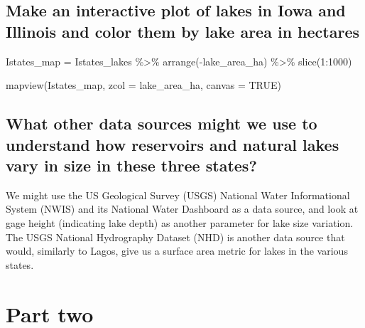 \documentclass[
]{book}
\newenvironment{Shaded}{\begin{snugshade}}{\end{snugshade}}
\newcommand{\AttributeTok}[1]{\textcolor[rgb]{0.77,0.63,0.00}{#1}}
\newcommand{\ConstantTok}[1]{\textcolor[rgb]{0.00,0.00,0.00}{#1}}
\newcommand{\DecValTok}[1]{\textcolor[rgb]{0.00,0.00,0.81}{#1}}
\newcommand{\FunctionTok}[1]{\textcolor[rgb]{0.00,0.00,0.00}{#1}}
\newcommand{\NormalTok}[1]{#1}
\newcommand{\OtherTok}[1]{\textcolor[rgb]{0.56,0.35,0.01}{#1}}
\newcommand{\SpecialCharTok}[1]{\textcolor[rgb]{0.00,0.00,0.00}{#1}}
\newcommand{\StringTok}[1]{\textcolor[rgb]{0.31,0.60,0.02}{#1}}
\begin{document}
\hypertarget{make-an-interactive-plot-of-lakes-in-iowa-and-illinois-and-color-them-by-lake-area-in-hectares}{%
\subsection{Make an interactive plot of lakes in Iowa and Illinois and color them by lake area in hectares}\label{make-an-interactive-plot-of-lakes-in-iowa-and-illinois-and-color-them-by-lake-area-in-hectares}}

\begin{Shaded}
\begin{Highlighting}[]
\NormalTok{Istates\_map }\OtherTok{=}\NormalTok{ Istates\_lakes }\SpecialCharTok{\%\textgreater{}\%}
  \FunctionTok{arrange}\NormalTok{(}\SpecialCharTok{{-}}\NormalTok{lake\_area\_ha) }\SpecialCharTok{\%\textgreater{}\%}
    \FunctionTok{slice}\NormalTok{(}\DecValTok{1}\SpecialCharTok{:}\DecValTok{1000}\NormalTok{)}

\FunctionTok{mapview}\NormalTok{(Istates\_map, }\AttributeTok{zcol =} \StringTok{\textquotesingle{}lake\_area\_ha\textquotesingle{}}\NormalTok{,  }\AttributeTok{canvas =} \ConstantTok{TRUE}\NormalTok{) }
\end{Highlighting}
\end{Shaded}

\hypertarget{what-other-data-sources-might-we-use-to-understand-how-reservoirs-and-natural-lakes-vary-in-size-in-these-three-states}{%
\subsection{What other data sources might we use to understand how reservoirs and natural lakes vary in size in these three states?}\label{what-other-data-sources-might-we-use-to-understand-how-reservoirs-and-natural-lakes-vary-in-size-in-these-three-states}}

We might use the US Geological Survey (USGS) National Water Informational System (NWIS) and its National Water Dashboard as a data source, and look at gage height (indicating lake depth) as another parameter for lake size variation. The USGS National Hydrography Dataset (NHD) is another data source that would, similarly to Lagos, give us a surface area metric for lakes in the various states.

\hypertarget{part-two}{%
\section{Part two}\label{part-two}}
\end{document}

